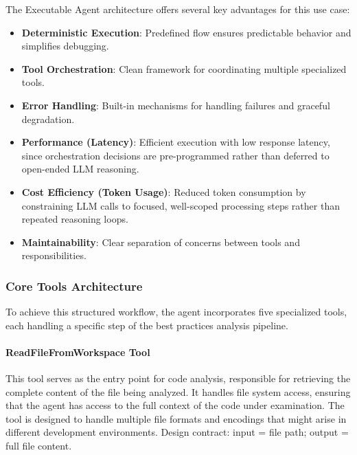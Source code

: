 \begin{spacing}{1.2}
The Executable Agent architecture offers several key advantages for this use case:
\begin{itemize}
    \item \textbf{Deterministic Execution}: Predefined flow ensures predictable behavior and simplifies debugging.
    \item \textbf{Tool Orchestration}: Clean framework for coordinating multiple specialized tools.
    \item \textbf{Error Handling}: Built-in mechanisms for handling failures and graceful degradation.
    \item \textbf{Performance (Latency)}: Efficient execution with low response latency, since orchestration decisions are pre-programmed rather than deferred to open-ended LLM reasoning.
    \item \textbf{Cost Efficiency (Token Usage)}: Reduced token consumption by constraining LLM calls to focused, well-scoped processing steps rather than repeated reasoning loops.
    \item \textbf{Maintainability}: Clear separation of concerns between tools and responsibilities.
\end{itemize}



\subsubsection{Core Tools Architecture}
To achieve this structured workflow, the agent incorporates five specialized tools, each handling a specific step of the best practices analysis pipeline.
\paragraph{ReadFileFromWorkspace Tool}
This tool serves as the entry point for code analysis, responsible for retrieving the complete content of the file being analyzed. It handles file system access, ensuring that the agent has access to the full context of the code under examination. The tool is designed to handle multiple file formats and encodings that might arise in different development environments. Design contract: input = file path; output = full file content.


\end{spacing}
